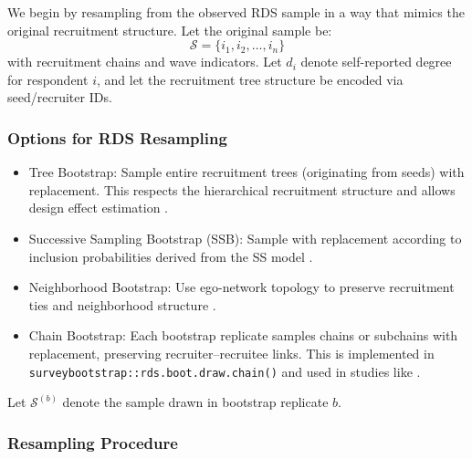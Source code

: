 \documentclass[
  12pt,
  letterpaper,
  DIV=11,
  numbers=noendperiod]{scrartcl}
\providecommand{\tightlist}{%
  \setlength{\itemsep}{0pt}\setlength{\parskip}{0pt}}
\theoremstyle{plain}
\theoremstyle{definition}
\begin{document}
{We begin by resampling from the observed RDS sample in a way that mimics
the original recruitment structure. Let the original sample be: \[
\mathcal{S} = \{i_1, i_2, \dots, i_n\}
\] with recruitment chains and wave indicators. Let \(d_i\) denote
self-reported degree for respondent \(i\), and let the recruitment tree
structure be encoded via seed/recruiter IDs.

\subsubsection{Options for RDS
Resampling}\label{options-for-rds-resampling}

\begin{itemize}
\tightlist
\item
  Tree Bootstrap: Sample entire recruitment trees (originating from
  seeds) with replacement. This respects the hierarchical recruitment
  structure and allows design effect estimation
  \autocite{salg06-variance}.
\item
  Successive Sampling Bootstrap (SSB): Sample with replacement according
  to inclusion probabilities derived from the SS model
  \autocite{gile11-improved}.
\item
  Neighborhood Bootstrap: Use ego-network topology to preserve
  recruitment ties and neighborhood structure
  \autocite{yauc22-neighborhood}.
\item
  Chain Bootstrap: Each bootstrap replicate samples chains or subchains
  with replacement, preserving recruiter--recruitee links. This is
  implemented in \texttt{surveybootstrap::rds.boot.draw.chain()} and
  used in studies like \textcite{weir12-comparison}.
\end{itemize}

Let \(\mathcal{S}^{(b)}\) denote the sample drawn in bootstrap replicate
\(b\).

\subsubsection{Resampling Procedure}\label{resampling-procedure}

}
\end{document}

